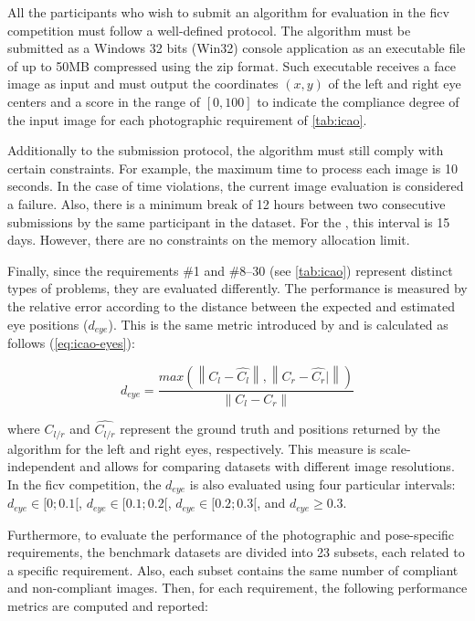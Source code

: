All the participants who wish to submit an algorithm for evaluation in the \acs{ficv} competition must follow a well-defined protocol. The algorithm must be submitted as a Windows 32 bits (Win32) console application as an executable file of up to 50MB compressed using the zip format. Such executable receives a face image as input and must output the coordinates $(x, y)$ of the left and right eye centers and a score in the range of $[0, 100]$ to indicate the compliance degree of the input image for each photographic requirement of \autoref{tab:icao}.

Additionally to the submission protocol, the algorithm must still comply with certain constraints. For example, the maximum time to process each image is 10 seconds. In the case of time violations, the current image evaluation is considered a failure. Also, there is a minimum break of 12 hours between two consecutive submissions by the same participant in the \ficvtest dataset. For the \ficvofficial, this interval is 15 days. However, there are no constraints on the memory allocation limit.

Finally, since the requirements \#1 and \#8--30 (see \autoref{tab:icao}) represent distinct types of problems, they are evaluated differently. The \eyecenterlocation performance is measured by the relative error according to the distance between the expected and estimated eye positions ($d_{eye}$). This is the same metric introduced by \cite{jesorsky2001robust} and is calculated as follows (\autoref{eq:icao-eyes}):

\begin{equation}
\label{eq:icao-eyes}
d_{eye} = \frac{max(\left\| C_l - \hat{C_l} \right\|, \left\| C_r -\hat{C_r}|\right\|)}{\left\| C_l - C_r \right\|}
\end{equation}

\noindent
where $C_{l/r}$ and $\hat{C_{l/r}}$ represent the ground truth and positions returned by the algorithm for the left and right eyes, respectively. This measure is scale-independent and allows for comparing datasets with different image resolutions. In the \acs{ficv} competition, the $d_{eye}$ is also evaluated using four particular intervals: $d_{eye} \in [0;0.1[$, $d_{eye} \in [0.1;0.2[$, $d_{eye} \in [0.2;0.3[$, and $d_{eye} \geq 0.3$.

Furthermore, to evaluate the performance of the photographic and pose-specific requirements, the benchmark datasets are divided into 23 subsets, each related to a specific requirement. Also, each subset contains the same number of compliant and non-compliant images. Then, for each requirement, the following performance metrics are computed and reported:

